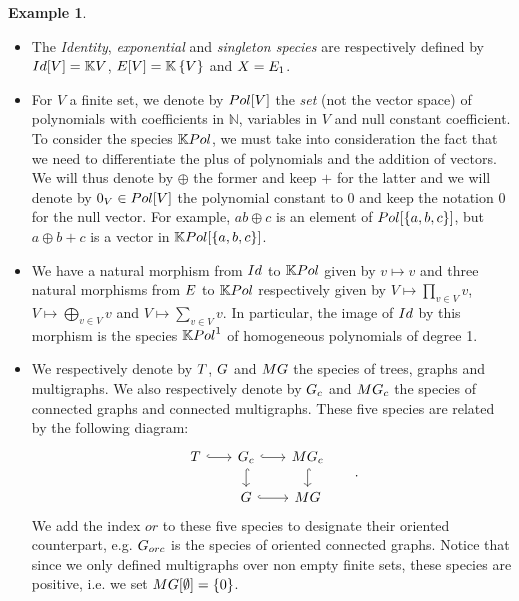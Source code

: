 \documentclass[11pt]{article}
\theoremstyle{definition}
\newtheorem{exam}[theo]{Example}
\numberwithin{equation}{section}
\newcommand{\set}[1]{\left\{#1\right\}}
\newcommand{\spe}[1]{\normalfont{\textsc{#1}}}
\newcommand{\N}{\mathbb{N}}
\newcommand{\K}{\mathbb{K}}
\newcommand{\id}{Id}
\newcommand{\T}{\spe{T}}
\newcommand{\G}{\spe{G}}
\newcommand{\MG}{\spe{MG}}
\newcommand{\Sym}{\spe{E}}
\begin{document}
\begin{exam}\label{ex_species}\
    \begin{itemize}
        \item The {\em Identity}, {\em exponential} and {\em singleton species} are respectively defined 
        by $\spe{\id}[V] = \K V$, $\Sym[V] = \K\set{V}$ and $\spe{X} = \Sym_1$.

        \item For $V$ a finite set, we denote by $\spe{Pol}[V]$ the \textit{set} (not the vector space) of 
        polynomials with coefficients in $\N$, variables in $V$ and null constant coefficient. To consider 
        the species $\K\spe{Pol}$, we must take into consideration the fact that we need to differentiate 
        the plus of polynomials and the addition of vectors. We will thus denote by $\oplus$ the former and
        keep $+$ for the latter and we will denote by $0_V\in\spe{Pol}[V]$ the polynomial constant to 0 and
        keep the notation $0$ for the null vector. For example, $ab\oplus c$ is an element of $\spe{Pol}
        [\{a,b,c\}]$, but $a\oplus b+c$ is a vector in $\K \spe{Pol}[\{a,b,c\}]$.

        \item We have a natural morphism from $\spe{\id}$ to $\K\spe{Pol}$ given by $v\mapsto v$ and three
        natural morphisms from $\Sym$ to $\K\spe{Pol}$ respectively given by $V\mapsto \prod_{v\in V}v$,
        $V\mapsto\bigoplus_{v\in V}v$ and $V\mapsto\sum_{v\in V}v$. In particular, the image of $\spe{\id}$ 
        by this morphism is the species $\K\spe{Pol}^1$ of homogeneous polynomials of degree 1.

        \item We respectively denote by $\T$, $\G$ and $\MG$ the species of trees, graphs and multigraphs.
        We also respectively denote by $\G_c$ and $\MG_c$ the species of connected graphs and connected
        multigraphs. These five species are related by the following diagram:
        \begin{equation}\label{graph_diagram}
            \begin{tikzcd}[row sep=scriptsize,column sep=scriptsize]
            \T \arrow[r, hook] & \G_c \arrow[r, hook] \arrow[d, hook] & \MG_c \arrow[d, hook] \\
            & \G \arrow[r, hook] & \MG & 
            \end{tikzcd}.
        \end{equation}
        We add the index $or$ to these five species to designate their oriented counterpart, e.g.
        $\G_{orc}$ is the species of oriented connected graphs. Notice that since we only defined
        multigraphs over non empty finite sets, these species are positive, i.e. we set $\MG[\emptyset] = \set{0}$.



\end{itemize}
\end{exam}
\end{document}
